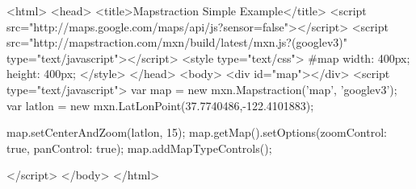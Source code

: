 <html>
<head>
   	<title>Mapstraction Simple Example</title>
   	<script src="http://maps.google.com/maps/api/js?sensor=false"></script>
   	<script src="http://mapstraction.com/mxn/build/latest/mxn.js?(googlev3)" type="text/javascript"></script>
	<style type="text/css">
	#map {
		width: 400px;
		height: 400px;
	}
	</style>
</head>
<body>
	<div id="map"></div>
	<script type="text/javascript">
		var map = new mxn.Mapstraction('map', 'googlev3'); 
		var latlon = new mxn.LatLonPoint(37.7740486,-122.4101883);

		map.setCenterAndZoom(latlon, 15);
		map.getMap().setOptions({zoomControl: true, panControl: true});
		map.addMapTypeControls();
		
	</script>
</body>
</html>	
